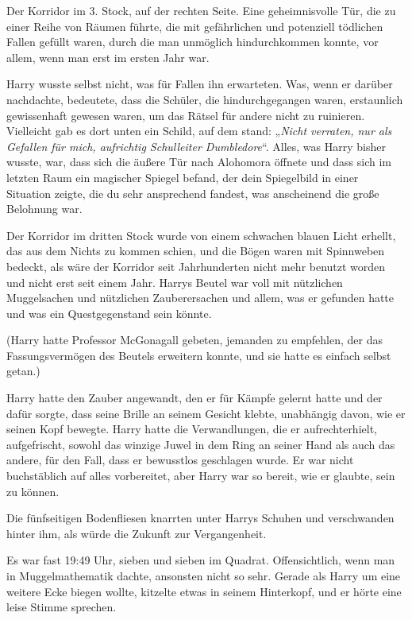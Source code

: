 {Der Korridor im 3. Stock, auf der rechten Seite. Eine geheimnisvolle Tür, die zu einer Reihe von Räumen führte, die mit gefährlichen und potenziell tödlichen Fallen gefüllt waren, durch die man unmöglich hindurchkommen konnte, vor allem, wenn man erst im ersten Jahr war.

Harry wusste selbst nicht, was für Fallen ihn erwarteten. Was, wenn er darüber nachdachte, bedeutete, dass die Schüler, die hindurchgegangen waren, erstaunlich gewissenhaft gewesen waren, um das Rätsel für andere nicht zu ruinieren. Vielleicht gab es dort unten ein Schild, auf dem stand: „\emph{Nicht verraten, nur als Gefallen für mich, aufrichtig Schulleiter Dumbledore}“. Alles, was Harry bisher wusste, war, dass sich die äußere Tür nach Alohomora öffnete und dass sich im letzten Raum ein magischer Spiegel befand, der dein Spiegelbild in einer Situation zeigte, die du sehr ansprechend fandest, was anscheinend die große Belohnung war.

Der Korridor im dritten Stock wurde von einem schwachen blauen Licht erhellt, das aus dem Nichts zu kommen schien, und die Bögen waren mit Spinnweben bedeckt, als wäre der Korridor seit Jahrhunderten nicht mehr benutzt worden und nicht erst seit einem Jahr. Harrys Beutel war voll mit nützlichen Muggelsachen und nützlichen Zauberersachen und allem, was er gefunden hatte und was ein Questgegenstand sein könnte.

(Harry hatte Professor McGonagall gebeten, jemanden zu empfehlen, der das Fassungsvermögen des Beutels erweitern konnte, und sie hatte es einfach selbst getan.)

Harry hatte den Zauber angewandt, den er für Kämpfe gelernt hatte und der dafür sorgte, dass seine Brille an seinem Gesicht klebte, unabhängig davon, wie er seinen Kopf bewegte. Harry hatte die Verwandlungen, die er aufrechterhielt, aufgefrischt, sowohl das winzige Juwel in dem Ring an seiner Hand als auch das andere, für den Fall, dass er bewusstlos geschlagen wurde. Er war nicht buchstäblich auf alles vorbereitet, aber Harry war so bereit, wie er glaubte, sein zu können.

Die fünfseitigen Bodenfliesen knarrten unter Harrys Schuhen und verschwanden hinter ihm, als würde die Zukunft zur Vergangenheit.

Es war fast 19:49 Uhr, sieben und sieben im Quadrat. Offensichtlich, wenn man in Muggelmathematik dachte, ansonsten nicht so sehr. Gerade als Harry um eine weitere Ecke biegen wollte, kitzelte etwas in seinem Hinterkopf, und er hörte eine leise Stimme sprechen.

}
